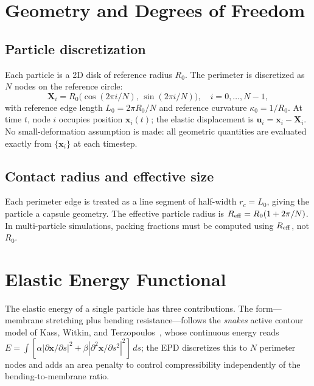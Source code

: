 \documentclass[aps,pre,twocolumn,floatfix,longbibliography]{revtex4-2}
\begin{document}
\section{Geometry and Degrees of Freedom}
\label{sec:geometry}

\subsection{Particle discretization}

Each particle is a 2D disk of reference radius $R_0$.  The perimeter is discretized
as $N$ nodes on the reference circle:
\begin{equation}
  \mathbf{X}_i = R_0 \bigl(\cos(2\pi i/N),\, \sin(2\pi i/N)\bigr),
  \quad i = 0,\ldots,N-1,
\label{eq:ref_config}
\end{equation}
with reference edge length $L_0 = 2\pi R_0/N$ and reference curvature
$\kappa_0 = 1/R_0$.  At time $t$, node $i$ occupies position $\mathbf{x}_i(t)$;
the elastic displacement is $\mathbf{u}_i = \mathbf{x}_i - \mathbf{X}_i$.  No
small-deformation assumption is made: all geometric quantities are evaluated
exactly from $\{\mathbf{x}_i\}$ at each timestep.

\subsection{Contact radius and effective size}

Each perimeter edge is treated as a line segment of half-width $r_c = L_0$, giving
the particle a capsule geometry.  The effective particle radius is
$R_{\rm eff} = R_0(1 + 2\pi/N)$.  In multi-particle simulations, packing fractions
must be computed using $R_{\rm eff}$, not $R_0$.

\section{Elastic Energy Functional}
\label{sec:energy}

The elastic energy of a single particle has three contributions.
The form---membrane stretching plus bending resistance---follows the
\emph{snakes} active contour model of Kass, Witkin, and
Terzopoulos~\cite{Kass1988}, whose continuous energy reads
$E = \int [\alpha |{\partial\mathbf{x}}/{\partial s}|^2 +
           \beta  |{\partial^2\mathbf{x}}/{\partial s^2}|^2]\,ds$;
the EPD discretizes this to $N$ perimeter nodes and adds an area penalty
to control compressibility independently of the bending-to-membrane ratio.
\end{document}
